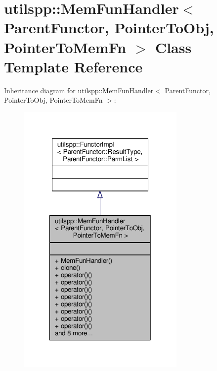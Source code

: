 \hypertarget{classutilspp_1_1MemFunHandler}{\section{utilspp\-:\-:Mem\-Fun\-Handler$<$ Parent\-Functor, Pointer\-To\-Obj, Pointer\-To\-Mem\-Fn $>$ Class Template Reference}
\label{classutilspp_1_1MemFunHandler}
}


Inheritance diagram for utilspp\-:\-:Mem\-Fun\-Handler$<$ Parent\-Functor, Pointer\-To\-Obj, Pointer\-To\-Mem\-Fn $>$\-:\nopagebreak
\begin{figure}[H]
\begin{center}
\leavevmode
\includegraphics[width=232pt]{classutilspp_1_1MemFunHandler__inherit__graph}
\end{center}
\end{figure}


